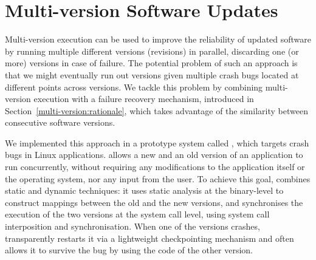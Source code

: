\chapter{Multi-version Software Updates}
\label{chap:safe-updates}



Multi-version execution can be used to improve the reliability of updated
software by running multiple different versions (revisions) in parallel,
discarding one (or more) versions in case of failure. The potential problem of
such an approach is that we might eventually run out versions given multiple
crash bugs located at different points across versions. We tackle this problem
by combining multi-version execution with a failure recovery mechanism,
introduced in Section~\ref{multi-version:rationale}, which takes advantage of
the similarity between consecutive software versions.


We implemented this approach in a prototype system called \mx, which
targets crash bugs in Linux applications.
\mx allows a new and an old version of an application to
run concurrently, without requiring any
modifications to the application itself or the operating system, nor any
input from the user. To achieve this goal, \mx combines static and
dynamic techniques: it uses static analysis at the binary-level to
construct mappings between the old and the new versions, and synchronises the
execution of the two versions at the system call level, using system call
interposition and synchronisation.  When one of the versions crashes, \mx
transparently restarts it via a lightweight checkpointing mechanism and often
allows it to survive the bug by using the code of the other version.

